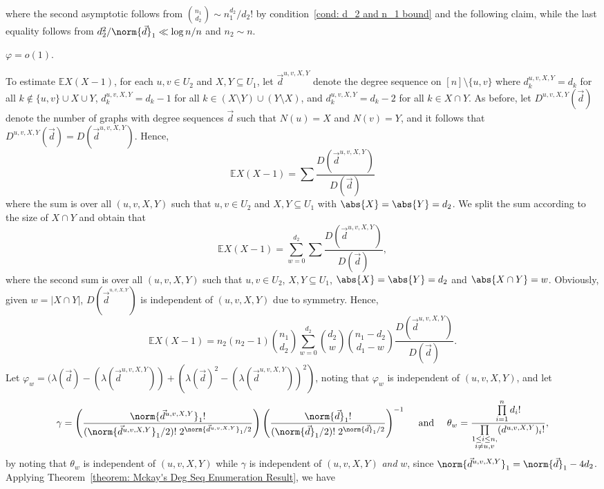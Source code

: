 \documentclass[12pt]{article}
\def\ex{{\mathbb E}}
\begin{document}
where the second asymptotic follows from $\binom{n_1}{d_2}\sim  n_1^{d_2}/d_2!$ by condition~\ref{cond: d_2 and n_1 bound} and the following claim, while the last equality follows from $d_2^2/\norm{\vec{d}}_1\ll\log n/n$ and $n_2\sim n$.
\begin{claim}
\label{claim: first moment exp vanishes}
$\varphi = o(1)$.
\end{claim}
To estimate $\ex X(X-1)$, for each $u,v\in U_2$ and $X,Y\subseteq U_1$, let $\vec{d}^{u,v,X,Y}$ denote the degree sequence on $[n]\setminus \{u,v\}$ where $d^{u,v,X,Y}_k = d_k$ for all $k\notin \{u,v\}\cup X\cup  Y$, $d^{u,v,X,Y}_k = d_k-1$ for all $k\in (X\setminus Y)\cup (Y\setminus X)$, and $d^{u,v,X,Y}_k = d_k-2$ for all $k\in X\cap Y$. As before, let $D^{u,v,X,Y}(\vec{d})$ denote the number of graphs  with degree sequences $\vec{d}$ such that $N(u)=X$ and $N(v)=Y$, and it follows that $D^{u,v,X,Y}(\vec{d})=D(\vec{d}^{u,v,X,Y})$. Hence,
\[
\ex{X(X-1)} = \sum \frac{D(\vec{d}^{u,v,X,Y})}{D(\vec{d})}
\]
where the sum is over all $(u,v,X,Y)$ such that 
$u,v\in U_2$ and $X,Y\subseteq U_1$ with $\abs{X} = \abs{Y}=d_2$.
We split the sum according to the size of $X\cap Y$ and obtain that
\[
\ex{X(X-1)} = \sum\limits_{w = 0}^{d_2}\sum \frac{D(\vec{d}^{u,v,X,Y})}{D(\vec{d})},
\]
where the second sum is over all $(u,v,X,Y)$ such that 
$u,v\in U_2$, $X,Y\subseteq U_1$, $\abs{X} = \abs{Y}=d_2$ and $\abs{X\cap Y} = w$. Obviously, given $w=|X\cap Y|$, $D(\vec{d}^{^{u,v,X,Y}})$ is independent of $(u,v,X,Y)$ due to symmetry. Hence,
\[
\ex{X(X-1)} = n_2(n_2-1)\binom{n_1}{d_2}\sum\limits_{w = 0}^{d_2} \binom{d_2}{w}\binom{n_1-d_2}{d_1-w}\frac{D(\vec{d}^{u,v,X,Y})}{D(\vec{d})}.
\]
Let $\varphi_w = (\lambda(\vec{d}) - (\lambda(\vec{d}^{u,v,X,Y})) + (\lambda(\vec{d})^2 - (\lambda(\vec{d}^{u,v,X,Y}))^2)$, noting that $\varphi_w$ is independent of $(u,v,X,Y)$, and let
\[
\gamma= \left(\frac{\norm{\vec{d}^{u,v,X,Y}}_1!}{(\norm{\vec{d}^{u,v,X,Y}}_1/2)!\hspace{1mm} 2^{\norm{\vec{d}^{u,v,X,Y}}_1/2} }\right)\left(\frac{\norm{\vec{d}}_1!}{(\norm{\vec{d}}_1/2)!\hspace{1mm} 2^{\norm{\vec{d}}_1/2}}\right)^{-1} \quad\text{ and }\quad \theta_w = \frac{\prod\limits_{i = 1}^{n} d_i!}{\prod\limits_{\substack{1\leq i\leq n,\\ i\neq u,v}} (d^{u,v,X,Y})_i!},
\]
by noting that $\theta_w$ is independent of $(u,v,X,Y)$ while $\gamma$ is independent of $(u,v,X,Y)$ \textit{and} $w$, since $\norm{\vec{d}^{u,v,X,Y}}_1 = \norm{\vec{d}}_1 - 4d_2$. Applying Theorem~\ref{theorem: Mckay's Deg Seq Enumeration Result}, we have
\end{document}
